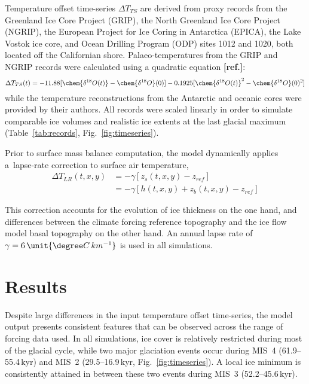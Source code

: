 \documentclass[tc, ms]{copernicus}
\newcommand{\aref}[0]{\textbf{[ref.]}}
\begin{document}
Temperature offset time-series ${\Delta}T_{TS}$ are derived from proxy records from
the Greenland Ice Core Project (GRIP), the North Greenland Ice Core Project
(NGRIP), the European Project for Ice Coring in Antarctica (EPICA), the Lake
Vostok ice core, and Ocean Drilling Program (ODP) sites 1012 and 1020, both
located off the Californian shore. Palaeo-temperatures from the GRIP and NGRIP
records were calculated using a quadratic equation \aref:
\begin{equation}
    {\Delta}T_{TS}(t) = -11.88[\chem{\delta^{18}O(t)}-\chem{\delta^{18}O}(0)]
                        -0.1925[\chem{\delta^{18}O(t)}^2-\chem{\delta^{18}O}(0)^2]
\end{equation}
while the temperature reconstructions from the Antarctic and oceanic cores were
provided by their authors. All records were scaled linearly in
order to simulate comparable ice volumes and realistic ice extents at the last
glacial maximum (Table~\ref{tab:records}, Fig.~\ref{fig:timeseries}).

Prior to surface mass balance computation, the model dynamically applies
a~lapse-rate correction to surface air temperature,
\begin{align}
    {\Delta}T_{LR}(t, x, y) &= -\gamma [z_{s}(t, x, y)-z_{ref}] \\
                            &= -\gamma [h(t, x, y)+z_{b}(t, x, y)-z_{ref}]
\end{align}


This correction accounts
for the evolution of ice thickness on the one hand, and differences between the
climate forcing reference topography and the ice flow model basal topography on
the other hand. An annual lapse rate of
$\gamma = 6\,\unit{{\degree}C\,km^{-1}}$
is used in all simulations.


\section{Results}
\label{sec:results}

Despite large differences in the input temperature offset time-series, the
model output presents consistent features that can be observed across the range
of forcing data used. In all simulations, ice cover is relatively restricted
during most of the glacial cycle, while two major glaciation events occur
during MIS~4 (61.9--55.4\,\unit{kyr}) and MIS~2 (29.5--16.9\,\unit{kyr},
Fig.~\ref{fig:timeseries}). A local ice minimum is consistently attained in between these
two events during MIS~3 (52.2--45.6\,\unit{kyr}).
\end{document}
